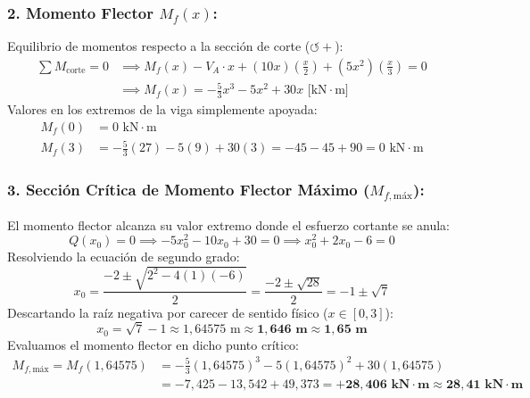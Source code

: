 \subsubsection*{2. Momento Flector $M_f(x)$:}
Equilibrio de momentos respecto a la sección de corte ($\circlearrowleft +$):
\begin{align}
    \sum M_{\text{corte}} = 0 & \implies M_f(x) - V_A \cdot x + (10x)\left(\frac{x}{2}\right) + (5x^2)\left(\frac{x}{3}\right) = 0 \nonumber \\
                              & \implies \boxed{M_f(x) = -\frac{5}{3}x^3 - 5x^2 + 30x\text{ [kN}\cdot\text{m]}}
\end{align}
Valores en los extremos de la viga simplemente apoyada:
\begin{align}
    M_f(0) & = 0\text{ kN}\cdot\text{m} \\[4pt]
    M_f(3) & = -\frac{5}{3}(27) - 5(9) + 30(3) = -45 - 45 + 90 = 0\text{ kN}\cdot\text{m}
\end{align}

\subsubsection*{3. Sección Crítica de Momento Flector Máximo ($M_{f,\text{máx}}$):}
El momento flector alcanza su valor extremo donde el esfuerzo cortante se anula:
\begin{equation}
    Q(x_0) = 0 \implies -5x_0^2 - 10x_0 + 30 = 0 \implies x_0^2 + 2x_0 - 6 = 0
\end{equation}
Resolviendo la ecuación de segundo grado:
\begin{equation}
    x_0 = \frac{-2 \pm \sqrt{2^2 - 4(1)(-6)}}{2} = \frac{-2 \pm \sqrt{28}}{2} = -1 \pm \sqrt{7}
\end{equation}
Descartando la raíz negativa por carecer de sentido físico ($x \in [0, 3]$):
\begin{equation}
    \boxed{x_0 = \sqrt{7} - 1 \approx 1{,}64575\text{ m} \approx \mathbf{1{,}646\text{ m} \approx 1{,}65\text{ m}}}
\end{equation}
Evaluamos el momento flector en dicho punto crítico:
\begin{align}
    M_{f,\text{máx}} = M_f(1{,}64575) & = -\frac{5}{3}(1{,}64575)^3 - 5(1{,}64575)^2 + 30(1{,}64575) \nonumber \\
                                     & = -7{,}425 - 13{,}542 + 49{,}373 = \mathbf{+28{,}406\text{ kN}\cdot\text{m} \approx 28{,}41\text{ kN}\cdot\text{m}}
\end{align}


